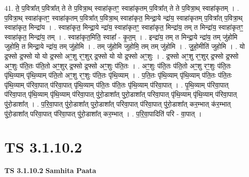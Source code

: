 \documentclass[17pt]{extarticle}
\begin{document}
41. ते॒ प॒वित्रा᳚त् प॒वित्रा᳚त् ते ते प॒वित्रा॒थ् स्वाहा॑कृतꣳ॒॒ स्वाहा॑कृतम् प॒वित्रा᳚त् ते ते प॒वित्रा॒थ् स्वाहा॑कृतम् । . प॒वित्रा॒थ् स्वाहा॑कृतꣳ॒॒ स्वाहा॑कृतम् प॒वित्रा᳚त् प॒वित्रा॒थ् स्वाहा॑कृत॒ मिन्द्रा॒ये न्द्रा॑य॒ स्वाहा॑कृतम् प॒वित्रा᳚त् प॒वित्रा॒थ् स्वाहा॑कृत॒ मिन्द्रा॑य । . स्वाहा॑कृत॒ मिन्द्रा॒ये न्द्रा॑य॒ स्वाहा॑कृतꣳ॒॒ स्वाहा॑कृत॒ मिन्द्रा॑य॒ तम् त मिन्द्रा॑य॒ स्वाहा॑कृतꣳ॒॒ स्वाहा॑कृत॒ मिन्द्रा॑य॒ तम् । . स्वाहा॑कृत॒मिति॒ स्वाहा᳚ - कृ॒त॒म् । . इन्द्रा॑य॒ तम् त मिन्द्रा॒ये न्द्रा॑य॒ तम् जु॑होमि जुहोमि॒ त मिन्द्रा॒ये न्द्रा॑य॒ तम् जु॑होमि । . तम् जु॑होमि जुहोमि॒ तम् तम् जु॑होमि । . जु॒हो॒मीति॑ जुहोमि । . यो द्र॒फ्सो द्र॒फ्सो यो यो द्र॒फ्सो अꣳ॒॒शु रꣳ॒॒शुर् द्र॒फ्सो यो यो द्र॒फ्सो अꣳ॒॒शुः । . द्र॒फ्सो अꣳ॒॒शु रꣳ॒॒शुर् द्र॒फ्सो द्र॒फ्सो अꣳ॒॒शुः प॑ति॒तः प॑ति॒तो अꣳ॒॒शुर् द्र॒फ्सो द्र॒फ्सो अꣳ॒॒शुः प॑ति॒तः । . अꣳ॒॒शुः प॑ति॒तः प॑ति॒तो अꣳ॒॒शु रꣳ॒॒शुः प॑ति॒तः पृ॑थि॒व्याम् पृ॑थि॒व्याम् प॑ति॒तो अꣳ॒॒शु रꣳ॒॒शुः प॑ति॒तः पृ॑थि॒व्याम् । . प॒ति॒तः पृ॑थि॒व्याम् पृ॑थि॒व्याम् प॑ति॒तः प॑ति॒तः पृ॑थि॒व्याम् प॑रिवा॒पात् प॑रिवा॒पात् पृ॑थि॒व्याम् प॑ति॒तः प॑ति॒तः पृ॑थि॒व्याम् प॑रिवा॒पात् । . पृ॒थि॒व्याम् प॑रिवा॒पात् प॑रिवा॒पात् पृ॑थि॒व्याम् पृ॑थि॒व्याम् प॑रिवा॒पात् पु॑रो॒डाशा᳚त् पुरो॒डाशा᳚त् परिवा॒पात् पृ॑थि॒व्याम् पृ॑थि॒व्याम् प॑रिवा॒पात् पु॑रो॒डाशा᳚त् । . प॒रि॒वा॒पात् पु॑रो॒डाशा᳚त् पुरो॒डाशा᳚त् परिवा॒पात् प॑रिवा॒पात् पु॑रो॒डाशा᳚त् कर॒म्भात् क॑र॒म्भात् पु॑रो॒डाशा᳚त् परिवा॒पात् प॑रिवा॒पात् पु॑रो॒डाशा᳚त् कर॒म्भात् । . प॒रि॒वा॒पादिति॑ परि - वा॒पात् । \newline
\pagebreak
{}

\section{ TS 3.1.10.2 }

\textbf{TS 3.1.10.2 } \newline
\textbf{Samhita Paata} \newline
\end{document}
